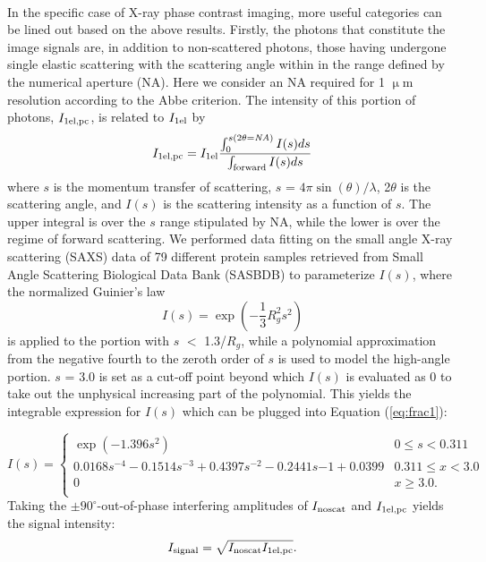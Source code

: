 \documentclass[]{article}
\newcommand\noscat{\textup{\scriptsize{noscat}}}
\newcommand\sel{\textup{\scriptsize{1el}}}
\newcommand\signal{\textup{\scriptsize{signal}}}
\newcommand\selpc{\textup{\scriptsize{1el,pc}}}
\begin{document}
\paragraph{} In the specific case of X-ray phase contrast imaging, more useful categories can be lined out based on the above results. Firstly, the photons that constitute the image signals are, in addition to non-scattered photons, those having undergone single elastic scattering with the scattering angle within in the range defined by the numerical aperture (NA). Here we consider an NA required for 1 $\upmu$m resolution according to the Abbe criterion. The intensity of this portion of photons, $I_{\selpc}$, is related to $I_{\sel}$ by
\begin{equation}
I_{\selpc} = I_{\sel} \frac{\int_{0}^{s(2\theta=\it{NA})}I(s)ds}{\int_{\textup{forward}}I(s)ds}
\label{eq:frac1}
\end{equation}
where $s$ is the momentum transfer of scattering, $s$ = $4\pi\sin(\theta)/\lambda$, 2$\theta$ is the scattering angle, and $I(s)$ is the scattering intensity as a function of $s$. The upper integral is over the $s$ range stipulated by NA, while the lower is over the regime of forward scattering. We performed data fitting on the small angle X-ray scattering (SAXS) data of 79 different protein samples retrieved from Small Angle Scattering Biological Data Bank (SASBDB) \cite{Valentini28102014} to parameterize $I(s)$, where the normalized Guinier's law
\begin{equation}
I(s) = \exp(-\frac{1}{3}R_g^2s^2)
\label{eq:guinier}
\end{equation}
is applied to the portion with $s$ $<$ 1.3/$R_g$, while a polynomial approximation from the negative fourth to the zeroth order of $s$ is used to model the high-angle portion. $s$ = 3.0 is set as a cut-off point beyond which $I(s)$ is evaluated as 0 to take out the unphysical increasing part of the polynomial. This yields the integrable expression for $I(s)$ which can be plugged into Equation (\ref{eq:frac1}):

\begin{equation}
I(s) = 
\begin{cases} 
      \exp(-1.396s^2) & 0 \leq s < 0.311 \\
      0.0168s^{-4} - 0.1514s^{-3} + 0.4397s^{-2} - 0.2441s{-1} + 0.0399 & 0.311 \leq x < 3.0 \\
      0 & x \geq 3.0. \\
   \end{cases}
\label{eq:fit}
\end{equation}
Taking the $\pm90^{\circ}$-out-of-phase interfering amplitudes of $I_{\noscat}$ and $I_{\selpc}$ yields the signal intensity:
\begin{equation}
I_{\signal} = \sqrt{I_{\noscat}I_{\selpc}}.
\end{equation}
\end{document}
